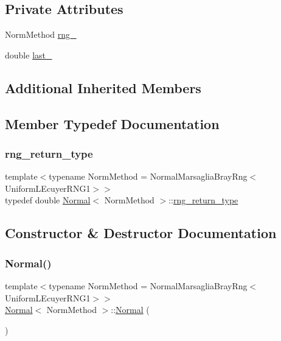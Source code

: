 \subsection*{Private Attributes}
\begin{DoxyCompactItemize}
\item 
Norm\+Method \hyperlink{class_normal_a84d6a0d0b702c4cc19d66f960040276c}{rng\+\_\+}
\item 
double \hyperlink{class_normal_a69f8977c8b8224cf6345b1e2d0d35382}{last\+\_\+}
\end{DoxyCompactItemize}
\subsection*{Additional Inherited Members}


\subsection{Member Typedef Documentation}
\hypertarget{class_normal_a32c30c2173a87e48270b909d9f9be06e}{}\label{class_normal_a32c30c2173a87e48270b909d9f9be06e} 
\subsubsection{\texorpdfstring{rng\+\_\+return\+\_\+type}{rng\_return\_type}}
{\footnotesize\ttfamily template$<$typename Norm\+Method  = Normal\+Marsaglia\+Bray\+Rng$<$\+Uniform\+L\+Ecuyer\+R\+N\+G1$>$$>$ \\
typedef double \hyperlink{class_normal}{Normal}$<$ Norm\+Method $>$\+::\hyperlink{class_normal_a32c30c2173a87e48270b909d9f9be06e}{rng\+\_\+return\+\_\+type}}



\subsection{Constructor \& Destructor Documentation}
\hypertarget{class_normal_abd6aa5f1a9d1619ad8db2600e11e795e}{}\label{class_normal_abd6aa5f1a9d1619ad8db2600e11e795e} 
\subsubsection{\texorpdfstring{Normal()}{Normal()}}
{\footnotesize\ttfamily template$<$typename Norm\+Method  = Normal\+Marsaglia\+Bray\+Rng$<$\+Uniform\+L\+Ecuyer\+R\+N\+G1$>$$>$ \\
\hyperlink{class_normal}{Normal}$<$ Norm\+Method $>$\+::\hyperlink{class_normal}{Normal} (\begin{DoxyParamCaption}{ }\end{DoxyParamCaption})\hspace{0.3cm}{\ttfamily [inline]}}



